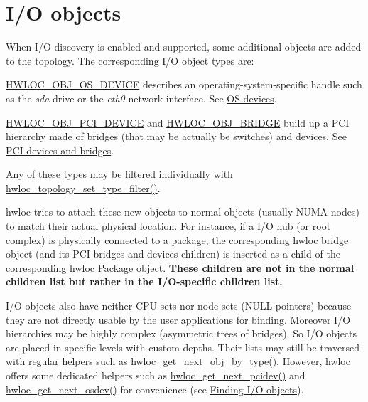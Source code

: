  \hypertarget{a00384_iodevices_objects}{}\section{I/\+O objects}\label{a00384_iodevices_objects}
When I/O discovery is enabled and supported, some additional objects are added to the topology. The corresponding I/O object types are\+: 
\begin{DoxyItemize}
\item {\ttfamily \hyperlink{a00184_ggacd37bb612667dc437d66bfb175a8dc55a51e7280240fd9f25589cbbe538bdb075}{H\+W\+L\+O\+C\+\_\+\+O\+B\+J\+\_\+\+O\+S\+\_\+\+D\+E\+V\+I\+CE}} describes an operating-\/system-\/specific handle such as the {\itshape sda} drive or the {\itshape eth0} network interface. See \hyperlink{a00384_iodevices_osdev}{OS devices}. 
\item {\ttfamily \hyperlink{a00184_ggacd37bb612667dc437d66bfb175a8dc55a5d8117a54df1fbd3606ab19e42cb0ea9}{H\+W\+L\+O\+C\+\_\+\+O\+B\+J\+\_\+\+P\+C\+I\+\_\+\+D\+E\+V\+I\+CE}} and {\ttfamily \hyperlink{a00184_ggacd37bb612667dc437d66bfb175a8dc55a6825f10895fea60aca7a6ba9fe273db0}{H\+W\+L\+O\+C\+\_\+\+O\+B\+J\+\_\+\+B\+R\+I\+D\+GE}} build up a P\+CI hierarchy made of bridges (that may be actually be switches) and devices. See \hyperlink{a00384_iodevices_pci}{P\+CI devices and bridges}. 
\end{DoxyItemize}Any of these types may be filtered individually with {\ttfamily \hyperlink{a00193_gad894e70f15f8d4aada7be8d1aba38b7e}{hwloc\+\_\+topology\+\_\+set\+\_\+type\+\_\+filter()}}.

hwloc tries to attach these new objects to normal objects (usually N\+U\+MA nodes) to match their actual physical location. For instance, if a I/O hub (or root complex) is physically connected to a package, the corresponding hwloc bridge object (and its P\+CI bridges and devices children) is inserted as a child of the corresponding hwloc Package object. {\bfseries These children are not in the normal children list but rather in the I/\+O-\/specific children list.}

I/O objects also have neither C\+PU sets nor node sets (N\+U\+LL pointers) because they are not directly usable by the user applications for binding. Moreover I/O hierarchies may be highly complex (asymmetric trees of bridges). So I/O objects are placed in specific levels with custom depths. Their lists may still be traversed with regular helpers such as \hyperlink{a00187_ga759e88eaf5a230ad283e9d4c42486735}{hwloc\+\_\+get\+\_\+next\+\_\+obj\+\_\+by\+\_\+type()}. However, hwloc offers some dedicated helpers such as \hyperlink{a00204_ga66470dabce9db19a57c5940a909d0baa}{hwloc\+\_\+get\+\_\+next\+\_\+pcidev()} and \hyperlink{a00204_ga8b4584c8949e2c5f1c97ba7fe92b8145}{hwloc\+\_\+get\+\_\+next\+\_\+osdev()} for convenience (see \hyperlink{a00204}{Finding I/O objects}).

